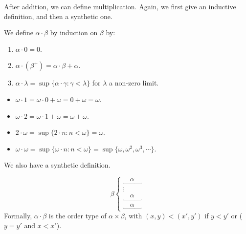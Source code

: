 \documentclass[a4paper]{article}
\begin{document}
After addition, we can define multiplication. Again, we first give an inductive definition, and then a synthetic one.
\begin{defi}
  We define $\alpha\cdot \beta$ by induction on $\beta$ by:
  \begin{enumerate}
    \item $\alpha\cdot 0 = 0$.
    \item $\alpha\cdot (\beta^+) = \alpha\cdot \beta + \alpha$.
    \item $\alpha\cdot \lambda = \sup\{\alpha\cdot \gamma: \gamma < \lambda\}$ for $\lambda$ a non-zero limit.
  \end{enumerate}
\end{defi}

\begin{eg}\leavevmode
  \begin{itemize}
    \item $\omega \cdot 1 = \omega\cdot 0 + \omega = 0 + \omega = \omega$.
    \item $\omega \cdot 2 = \omega \cdot 1 + \omega = \omega + \omega$.
    \item $2\cdot \omega = \sup\{2\cdot n: n < \omega\} = \omega$.
    \item $\omega\cdot \omega = \sup \{\omega\cdot n: n < \omega\} = \sup\{\omega, \omega^2, \omega^3, \cdots\}$.
  \end{itemize}
\end{eg}

We also have a synthetic definition.
\begin{defi}
  \[
    \beta\left\{
      \begin{array}{c}
        \underbracket{\quad\alpha\quad} \\
        \vdots \\
        \underbracket{\quad\alpha\quad} \\
        \underbracket{\quad\alpha\quad}
      \end{array}\right.
    \]
  Formally, $\alpha\cdot \beta$ is the order type of $\alpha\times \beta$, with $(x, y) < (x', y')$ if $y < y'$ or ($y = y'$ and $x < x'$).
\end{defi}
\end{document}
